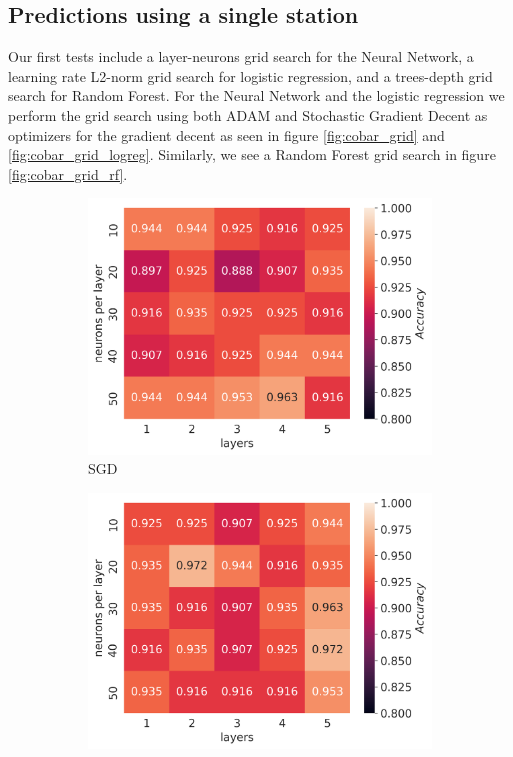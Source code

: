 \documentclass[11pt]{article}
\begin{document}
\subsection{Predictions using a single station}
Our first tests include a layer-neurons grid search for the Neural Network, a learning rate L2-norm grid search for logistic regression, and a trees-depth grid search for Random Forest. For the Neural Network and the logistic regression we perform the grid search using both ADAM and Stochastic Gradient Decent as optimizers for the gradient decent as seen in figure \ref{fig:cobar_grid} and \ref{fig:cobar_grid_logreg}. Similarly, we see a Random Forest grid search in figure \ref{fig:cobar_grid_rf}.
\begin{figure}[H]
    \begin{subfigure}{.5\textwidth}
        \centering
        \includegraphics[width=\textwidth]{../figures/NN_grid_SGD_bootstrap_cobar.png}
        \caption{SGD}
        \label{fig:}
    \end{subfigure}
    \begin{subfigure}{.5\textwidth}
        \centering
        \includegraphics[width=\textwidth]{../figures/NN_grid_ADAM_bootstrap_cobar.png}

\end{subfigure}
\end{figure}
\end{document}

